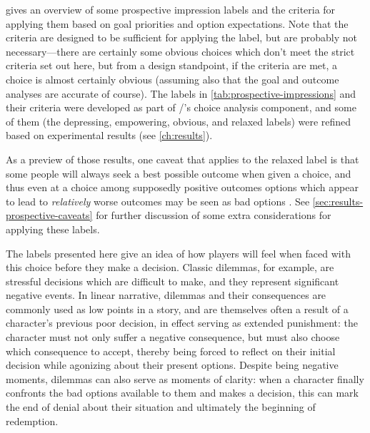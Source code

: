  gives an overview of some prospective impression labels and the criteria for applying them based on goal priorities and option expectations.
%
Note that the criteria are designed to be sufficient for applying the label, but are probably not necessary---there are certainly some obvious choices which don't meet the strict criteria set out here, but from a design standpoint, if the criteria are met, a choice is almost certainly obvious (assuming also that the goal and outcome analyses are accurate of course).
%
The labels in \cref{tab:prospective-impressions} and their criteria were developed as part of \dunyazad/'s choice analysis component, and some of them (the depressing, empowering, obvious, and relaxed labels) were refined based on experimental results (see \cref{ch:results}).


As a preview of those results, one caveat that applies to the relaxed label is that some people will always seek a best possible outcome when given a choice, and thus even at a choice among supposedly positive outcomes options which appear to lead to \emph{relatively} worse outcomes may be seen as bad options \citep{Schwartz2002}.
%
See \cref{sec:results-prospective-caveats} for further discussion of some extra considerations for applying these labels.


The labels presented here give an idea of how players will feel when faced with this choice before they make a decision.
%
Classic dilemmas, for example, are stressful decisions which are difficult to make, and they represent significant negative events.
%
In linear narrative, dilemmas and their consequences are commonly used as low points in a story, and are themselves often a result of a character's previous poor decision, in effect serving as extended punishment: the character must not only suffer a negative consequence, but must also choose which consequence to accept, thereby being forced to reflect on their initial decision while agonizing about their present options.
%
Despite being negative moments, dilemmas can also serve as moments of clarity: when a character finally confronts the bad options available to them and makes a decision, this can mark the end of denial about their situation and ultimately the beginning of redemption.


